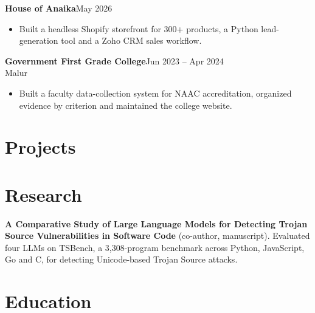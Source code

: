 \documentclass[a4paper,10pt]{article}
\newenvironment{bullets}{\begin{itemize}[leftmargin=1.2em, itemsep=1pt, topsep=1.5pt, partopsep=0pt, parsep=0pt]}{\end{itemize}\vspace{1pt}}
\newcommand{\job}[4]{\textbf{#1}\hfill{\small #2}\\[-1pt]\hspace*{0.8em}{\small\itshape #3}\hfill{\small #4}\vspace{1pt}}
\begin{document}
\job{House of Anaika}{May 2026}{Freelance Software Developer}{}
\begin{bullets}
  \item Built a headless Shopify storefront for 300+ products, a Python lead-generation tool and a Zoho CRM sales workflow.
\end{bullets}

\job{Government First Grade College}{Jun 2023 -- Apr 2024}{IT Head (Freelance)}{Malur}
\begin{bullets}
  \item Built a faculty data-collection system for NAAC accreditation, organized evidence by criterion and maintained the college website.
\end{bullets}

\section*{Projects}
\roleProjects

\section*{Research}
\textbf{A Comparative Study of Large Language Models for Detecting Trojan Source Vulnerabilities in Software Code} (co-author, manuscript). Evaluated four LLMs on TSBench, a 3,308-program benchmark across Python, JavaScript, Go and C, for detecting Unicode-based Trojan Source attacks.

\section*{Education}
\renewcommand{\arraystretch}{1.1}
\end{document}
